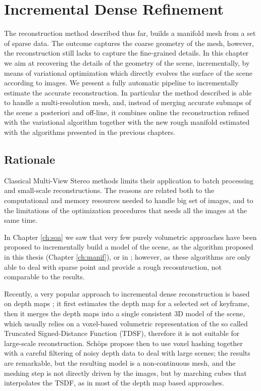 \chapter{Incremental Dense Refinement}
\label{ch:incrDenseRef}
The reconstruction method described thus far, builds a manifold mesh from a set of sparse data. 
The outcome captures the coarse geometry of the mesh, however, the reconstruction still lacks to capture the fine-grained details.
In this chapter we aim at recovering the details of the geometry of the scene, incrementally, by means of variational optimization which directly evolves the surface of the scene according to images. 
We present a fully automatic pipeline to incrementally estimate the accurate reconstruction. 
In particular the method described is able to handle a multi-resolution mesh, and, instead of merging accurate submaps of the scene a posteriori and off-line, it combines online the reconstruction refined with the variational algorithm together with the new rough manifold estimated with the algorithms presented in the previous chapters.

\minitoc
\newpage

\section{Rationale}

Classical Multi-View Stereo methods \cite{gargallo2005bayesian,delaunoy_et_al_08} limits their application to batch processing and small-scale reconstructions.
The reasons are related both to the computational and memory resources needed to handle big set of images, and to the limitations of the optimization procedures that needs all the images at the same time.

In Chapter \ref{ch:soa} we saw that very few purely volumetric approaches have been proposed to incrementally build a model of the scene, as the algorithm proposed in this thesis (Chapter \ref{ch:manif}), or in \cite{lovi_et_al_11,hoppe2013incremental,litvinov_lhuillier_13}; however, as these algorithms are  only able to deal with sparse point and provide a rough recosntruction, not comparable to the \mvs results.

Recently, a very popular approach to  incremental dense reconstruction is based on depth maps\cite{pollefeys_et_al_08,collins1996space,newcombe2010live,ohtake2003multi,stuhmer2012parallel,stuckler2014multi} ; it first estimates the depth map for a selected set of keyframe, then it merges the depth maps into a single consistent 3D model of the scene, which usually relies on a voxel-based volumetric representation of the so called Truncated Signed-Distance Function (TDSF), therefore it is not suitable for large-scale reconstruction. 
Sch{\"o}ps \etal \cite{schops20153d} propose then to use voxel hashing together with a careful filtering of noisy depth data to deal with large scenes; the results are remarkable, but the resulting model is a non-continuous mesh, and the meshing step is not directly driven by the images, but by marching cubes \cite{lorensen1987marching} that interpolates the TSDF, as in most of the depth map based approaches.

